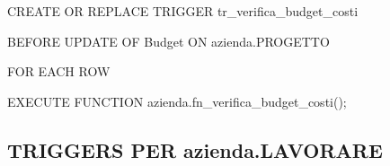     \ttfamily
        \begin{flushleft}
            \begin{description}
                \item CREATE OR REPLACE TRIGGER tr\_verifica\_budget\_costi
                \item BEFORE UPDATE OF Budget ON azienda.PROGETTO
                \item FOR EACH ROW
                \item EXECUTE FUNCTION azienda.fn\_verifica\_budget\_costi();
            \end{description}
        \end{flushleft}
    \normalfont

\newpage

    \subsection{TRIGGERS PER azienda.LAVORARE}

